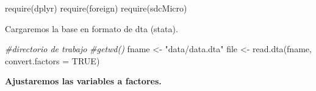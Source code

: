 \documentclass[
]{book}
\newenvironment{Shaded}{\begin{snugshade}}{\end{snugshade}}
\newcommand{\AttributeTok}[1]{\textcolor[rgb]{0.77,0.63,0.00}{#1}}
\newcommand{\CommentTok}[1]{\textcolor[rgb]{0.56,0.35,0.01}{\textit{#1}}}
\newcommand{\ConstantTok}[1]{\textcolor[rgb]{0.00,0.00,0.00}{#1}}
\newcommand{\FunctionTok}[1]{\textcolor[rgb]{0.00,0.00,0.00}{#1}}
\newcommand{\NormalTok}[1]{#1}
\newcommand{\OtherTok}[1]{\textcolor[rgb]{0.56,0.35,0.01}{#1}}
\newcommand{\StringTok}[1]{\textcolor[rgb]{0.31,0.60,0.02}{#1}}
\theoremstyle{definition}
\theoremstyle{definition}
\theoremstyle{definition}
\theoremstyle{definition}
\theoremstyle{remark}
\begin{document}
\begin{Shaded}
\begin{Highlighting}[]
\FunctionTok{require}\NormalTok{(dplyr)}
\FunctionTok{require}\NormalTok{(foreign)}
\FunctionTok{require}\NormalTok{(sdcMicro)}
\end{Highlighting}
\end{Shaded}

Cargaremos la base en formato de dta (stata).

\begin{Shaded}
\begin{Highlighting}[]
\CommentTok{\#directorio de trabajo}
\CommentTok{\#getwd()}
\NormalTok{fname }\OtherTok{\textless{}{-}} \StringTok{"data/data.dta"}
\NormalTok{file }\OtherTok{\textless{}{-}} \FunctionTok{read.dta}\NormalTok{(fname, }\AttributeTok{convert.factors =} \ConstantTok{TRUE}\NormalTok{)}
\end{Highlighting}
\end{Shaded}

\textbf{Ajustaremos las variables a factores.}
\end{document}
